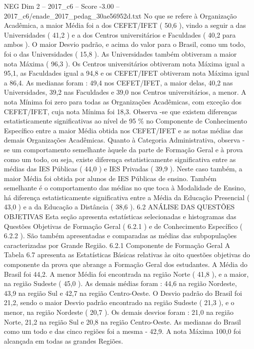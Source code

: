 \begin{textsample}{NEG Dim 2 – 2017\_c6 – Score -3.00 – 2017\_c6/enade\_2017\_pedag\_30ae56952d.txt}
No que se refere à Organização Acadêmica, a maior Média foi a dos CEFET/IFET ( 50,6 ), vindo a seguir a das Universidades ( 41,2 ) e a dos Centros universitários e Faculdades ( 40,2 para ambos ).
O maior Desvio padrão, e acima do valor para o Brasil, como um todo, foi o das Universidades ( 15,8 ).
As Universidades também obtiveram a maior nota Máxima ( 96,3 ).
Os Centros universitários obtiveram nota Máxima igual a 95,1, as Faculdades igual a 94,8 e os CEFET/IFET obtiveram nota Máxima igual a 86,4.
As medianas foram : 49,4 nos CEFET/IFET, a maior delas, 40,2 nas Universidades, 39,2 nas Faculdades e 39,0 nos Centros universitários, a menor.
A nota Mínima foi zero para todas as Organizações Acadêmicas, com exceção dos CEFET/IFET, cuja nota Mínima foi 18,3.
Observa -se que existem diferenças estatisticamente significativas ao nível de 95 \% no Componente de Conhecimento Específico entre a maior Média obtida nos CEFET/IFET e as notas médias das demais Organizações Acadêmicas.
Quanto à Categoria Administrativa, observa -se um comportamento semelhante àquele da parte de Formação Geral e à prova como um todo, ou seja, existe diferença estatisticamente significativa entre as médias das IES Públicas ( 44,0 ) e IES Privadas ( 39,9 ).
Neste caso também, a maior Média foi obtida por alunos de IES Públicas de ensino.
Também semelhante é o comportamento das médias no que toca à Modalidade de Ensino, há diferença estatisticamente significativa entre a Média da Educação Presencial ( 43,0 ) e a da Educação a Distância ( 38,6 ). 6.2 ANÁLISE DAS QUESTÕES OBJETIVAS Esta seção apresenta estatísticas selecionadas e histogramas das Questões Objetivas de Formação Geral ( 6.2.1 ) e de Conhecimento Específico ( 6.2.2 ).
São também apresentadas e comparadas as médias das subpopulações caracterizadas por Grande Região. 6.2.1 Componente de Formação Geral A Tabela 6.7 apresenta as Estatísticas Básicas relativas às oito questões objetivas do componente da prova que abrange a Formação Geral dos estudantes.
A Média do Brasil foi 44,2.
A menor Média foi encontrada na região Norte ( 41,8 ), e a maior, na região Sudeste ( 45,0 ).
As demais médias foram : 44,6 na região Nordeste, 43,9 na região Sul e 42,7 na região Centro-Oeste.
O Desvio padrão do Brasil foi 21,2, sendo o maior Desvio padrão encontrado na região Sudeste ( 21,3 ), e o menor, na região Nordeste ( 20,7 ).
Os demais desvios foram : 21,0 na região Norte, 21,2 na região Sul e 20,8 na região Centro-Oeste.
As medianas do Brasil como um todo e das cinco regiões foi a mesma - 42,9.
A nota Máxima 100,0 foi alcançada em todas as grandes Regiões.

\end{textsample}
